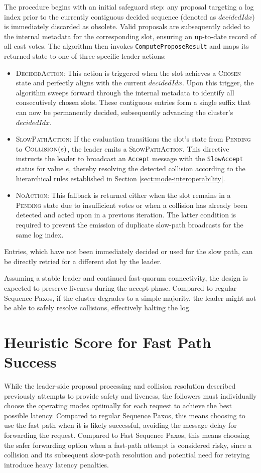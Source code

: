 The procedure begins with an initial safeguard step: any proposal targeting a log index prior to the currently contiguous decided sequence (denoted as $decidedIdx$) is immediately discarded as obsolete. Valid proposals are subsequently added to the internal metadata for the corresponding slot, ensuring an up-to-date record of all cast votes. The algorithm then invokes \texttt{ComputeProposeResult} and maps its returned state to one of three specific leader actions:
\begin{itemize}
    \item \textsc{DecidedAction}: This action is triggered when the slot achieves a \textsc{Chosen} state and perfectly aligns with the current $decidedIdx$. Upon this trigger, the algorithm sweeps forward through the internal metadata to identify all consecutively chosen slots. These contiguous entries form a single suffix that can now be permanently decided, subsequently advancing the cluster's $decidedIdx$.
    \item \textsc{SlowPathAction}: If the evaluation transitions the slot's state from \textsc{Pending} to $\textsc{Collision}(e)$, the leader emits a \textsc{SlowPathAction}. This directive instructs the leader to broadcast an \texttt{Accept} message with the \texttt{SlowAccept} status for value $e$, thereby resolving the detected collision according to the hierarchical rules established in Section \ref{sect:mode-interoperability}.
    \item \textsc{NoAction}: This fallback is returned either when the slot remains in a \textsc{Pending} state due to insufficient votes or when a collision has already been detected and acted upon in a previous iteration. The latter condition is required to prevent the emission of duplicate slow-path broadcasts for the same log index.
\end{itemize}

Entries, which have not been immediately decided or used for the slow path, can be directly retried for a different slot by the leader.

Assuming a stable leader and continued fast-quorum connectivity, the design is expected to preserve liveness during the accept phase. Compared to regular Sequence Paxos, if the cluster degrades to a simple majority, the leader might not be able to safely resolve collisions, effectively halting the log.

\section{Heuristic Score for Fast Path Success}
\label{sec:heuristic_score}
While the leader-side proposal processing and collision resolution described previously attempts to provide safety and liveness, the followers must individually choose the operating modes optimally for each request to achieve the best possible latency. Compared to regular Sequence Paxos, this means choosing to use the fast path when it is likely successful, avoiding the message delay for forwarding the request. Compared to Fast Sequence Paxos, this means choosing the safer forwarding option when a fast-path attempt is considered risky, since a collision  and its subsequent slow-path resolution and potential need for retrying introduce heavy latency penalties.

